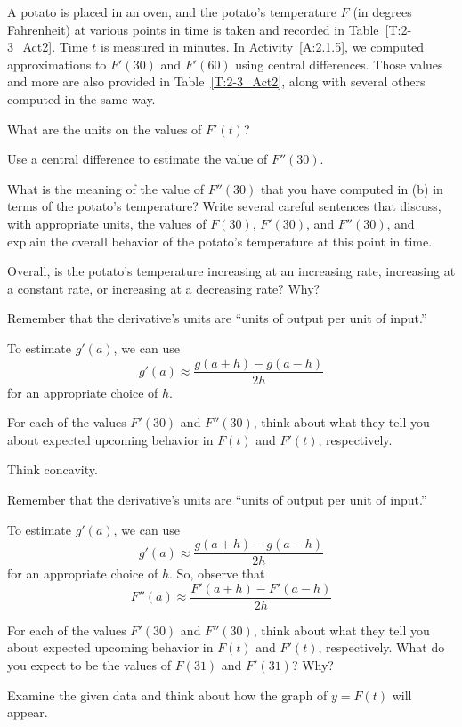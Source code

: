 \begin{activity} \label{A:2.3.3}
A potato is placed in an oven, and the potato's temperature $F$ (in degrees Fahrenheit) at various points in time is taken and recorded in Table~\ref{T:2-3_Act2}. Time $t$ is measured in minutes.  In Activity~\ref{A:2.1.5}, we computed approximations to $F'(30)$ and $F'(60)$ using central differences.  Those values and more are also provided in Table~\ref{T:2-3_Act2}, along with several others computed in the same way.

\ba
	\item What are the units on the values of $F'(t)$? 
	\item Use a central difference to estimate the value of $F''(30)$.
	\item What is the meaning of the value of $F''(30)$ that you have computed in (b) in terms of the potato's temperature?  Write several careful sentences that discuss, with appropriate units, the values of $F(30)$, $F'(30)$, and $F''(30)$, and explain the overall behavior of the potato's temperature at this point in time.
	\item Overall, is the potato's temperature increasing at an increasing rate, increasing at a constant rate, or increasing at a decreasing rate?  Why?
\ea

\end{activity}
\begin{smallhint}
\ba
	\item Remember that the derivative's units are ``units of output per unit of input.'' 
	\item To estimate $g'(a)$, we can use 
	$$g'(a) \approx \frac{g(a+h)-g(a-h)}{2h}$$
	for an appropriate choice of $h$.
	\item For each of the values $F'(30)$ and $F''(30)$, think about what they tell you about expected upcoming behavior in $F(t)$ and $F'(t)$, respectively.
	\item Think concavity.
\ea
\end{smallhint}
\begin{bighint}
\ba
	\item Remember that the derivative's units are ``units of output per unit of input.'' 
	\item To estimate $g'(a)$, we can use 
	$$g'(a) \approx \frac{g(a+h)-g(a-h)}{2h}$$
	for an appropriate choice of $h$.  So, observe that
	$$F''(a) \approx \frac{F'(a+h)-F'(a-h)}{2h}$$
	\item For each of the values $F'(30)$ and $F''(30)$, think about what they tell you about expected upcoming behavior in $F(t)$ and $F'(t)$, respectively.  What do you expect to be the values of $F(31)$ and $F'(31)$?  Why?
	\item Examine the given data and think about how the graph of $y = F(t)$ will appear.
\ea
\end{bighint}
